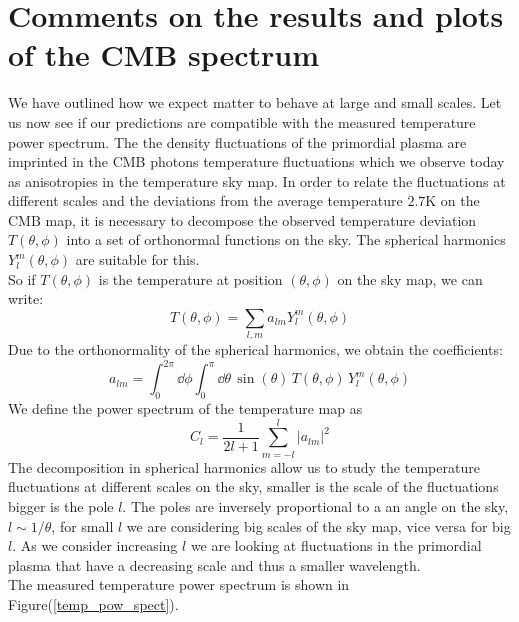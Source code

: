 \documentclass{article}
\begin{document}
\section{Comments on the results and plots of the CMB spectrum}
We have outlined how we expect matter to behave at large and small scales.
Let us now see if our predictions are compatible with the measured temperature power spectrum.
The the density fluctuations of the primordial plasma are imprinted in the CMB photons temperature fluctuations which we observe today as anisotropies in the temperature sky map.
In order to relate the fluctuations at different scales and the deviations from the average temperature $2.7 \text{K}$ on the CMB map, it is necessary to decompose the observed temperature deviation $T(\theta, \phi)$ into a set of orthonormal functions on the sky.
The spherical harmonics $Y^{m} _{l} (\theta, \phi)$ are suitable for this.\\
So if $T(\theta,\phi)$ is the temperature at position $(\theta,\phi)$ on the sky map,
we can write:
\begin{equation}
T(\theta, \phi) = \sum _{l, m} a_{lm} Y^{m} _l (\theta, \phi)
\end{equation}
Due to the orthonormality of the spherical harmonics, we obtain the coefficients:
\begin{equation}
a_{lm} = \int _0 ^{2 \pi} \dd \phi \int _0  ^{\pi} \dd \theta \,
\sin( \theta) \, T(\theta, \phi) \, Y^{m} _l (\theta, \phi)
 \end{equation} 
We define the power spectrum of the temperature map as 
 \begin{equation}
 C_l = \dfrac{1}{2l+1} \sum _{m=-l} ^{l} |a_{lm}|^2
 \end{equation}
The decomposition in spherical harmonics allow us to study the temperature fluctuations at different scales on the sky, smaller is the scale of the fluctuations bigger is the pole $l$.
The poles are inversely proportional to a an angle on the sky, $l \sim 1/ \theta$, for small $l$ we are considering big scales of the sky map, vice versa for big $l$.
As we consider increasing $l$ we are looking at fluctuations in the primordial plasma that have a decreasing  scale and thus a smaller wavelength.\\
The measured temperature power spectrum is shown in Figure(\ref{temp_pow_spect}).
%
%
%
\end{document}
